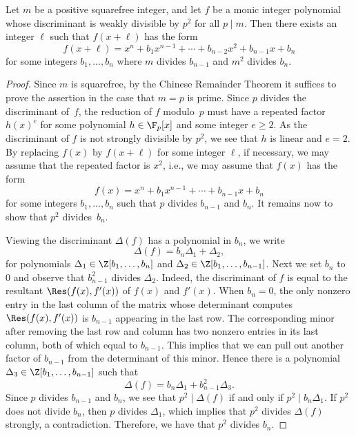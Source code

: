 \begin{proposition}
\notready\label{prop:hiddenp2}
Let $m$ be a positive squarefree integer, and let $f$ be a monic
integer polynomial whose discriminant is weakly divisible by $p^2$ for all $p\mid m$.
Then there exists an integer $\ell$ such that $f(x+\ell )$ has
the form
\begin{equation}
f(x+\ell ) = x^n + b_1x^{n-1} + \cdots + b_{n-2}x^2 + b_{n-1}x +
b_n
\end{equation}
for some integers $b_1,\ldots,b_n$ where $m$ divides $b_{n-1}$ and $m^2$ divides $b_n$.
\end{proposition}
\begin{proof}
Since $m$ is squarefree, by the Chinese Remainder Theorem it suffices
to prove the assertion in the case that $m=p$ is prime. Since $p$
divides the discriminant of~$f$, the reduction of $f$ modulo~$p$ must
have a repeated factor $h(x)^e$ for some polynomial $h\in \F_p[x]$ and
some integer $e\geq2$. As the discriminant of $f$ is not strongly
divisible by $p^2$, we see that $h$ is linear and $e=2$. By replacing
$f(x)$ by $f(x+\ell )$ for some integer $\ell$, if necessary, we may
assume that the repeated factor is $x^2$, i.e., we may assume that
$f(x)$ has the form $$f(x) = x^n + b_1x^{n-1} + \cdots + b_{n-1}x +
b_n$$ for some integers $b_1,\ldots,b_n$ such that $p$ divides
$b_{n-1}$ and $b_n$. It remains now to show that $p^2$ divides~$b_n$.

Viewing the discriminant $\Delta(f)$ has a polynomial in $b_n$,
we write
$$\Delta(f) = b_n\Delta_1 + \Delta_2,$$ for polynomials $\Delta_1\in
\Z[b_1,\ldots,b_n]$ and $\Delta_2\in \Z[b_1,\ldots,b_{n-1}]$. Next we
set $b_n$ to $0$ and observe that $b_{n-1}^2$ divides
$\Delta_2$. Indeed, the discriminant of $f$ is equal to the resultant
$\Res(f(x),f'(x))$ of $f(x)$ and $f'(x)$.  When $b_n=0$, the only
nonzero entry in the last column of the matrix whose determinant
computes $\Res(f(x),f'(x))$ is $b_{n-1}$ appearing in the last
row. The corresponding minor after removing the last row and column
has two nonzero entries in its last column, both of which equal to
$b_{n-1}$. This implies that we can pull out another factor of $b_{n-1}$ from the determinant of this minor.
Hence there is a polynomial $\Delta_3\in
\Z[b_1,\ldots,b_{n-1}]$ such that
\begin{equation}\Delta(f) = b_n\Delta_1 + b_{n-1}^2\Delta_3.
\end{equation}
Since $p$ divides $b_{n-1}$ and $b_n$, we see that $p^2\mid \Delta(f)$
if and only if $p^2\mid b_n\Delta_1$. If $p^2$ does not divide $b_n$,
then $p$ divides $\Delta_1$, which implies that $p^2$ divides $\Delta(f)$
strongly, a contradiction. Therefore, we have that $p^2$ divides $b_n$.
\end{proof}

